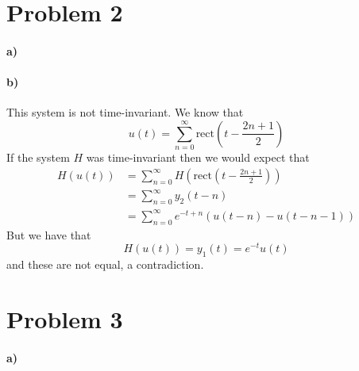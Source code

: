 \documentclass[12pt]{article}
\begin{document}
\section*{Problem 2}

\paragraph{a)}

\begin{center}
\end{center}

\paragraph{b)}

This system is not time-invariant. We know that
\[u(t)=\sum_{n=0}^\infty \text{rect}\left(t-\frac{2n+1}{2}\right)\]
If the system \(H\) was time-invariant then we would expect that
\begin{align*}
    H(u(t))&=\sum_{n=0}^\infty H\left(\text{rect}\left(t-\frac{2n+1}{2}\right)\right)\\
    &=\sum_{n=0}^\infty y_2(t-n)\\
    &=\sum_{n=0}^\infty e^{-t+n}(u(t-n)-u(t-n-1))
\end{align*}
But we have that
\[H(u(t))=y_1(t)=e^{-t}u(t)\]
and these are not equal, a contradiction.

\section*{Problem 3}

\paragraph{a)}
\end{document}
